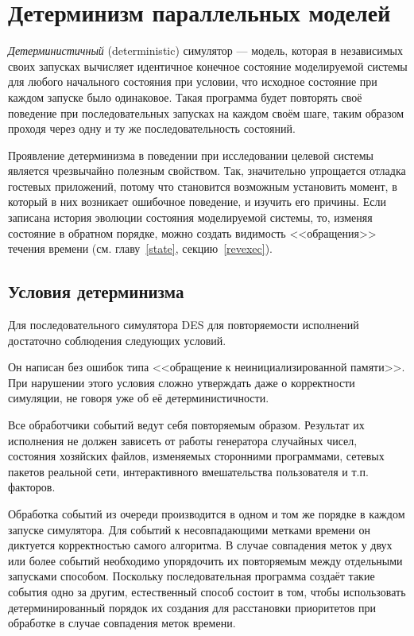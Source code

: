 \section{Детерминизм параллельных моделей}

\emph{Детерминистичный} (\abbr deterministic) симулятор — модель, которая в независимых своих запусках вычисляет идентичное конечное состояние моделируемой системы для любого начального состояния при условии, что исходное состояние при каждом запуске было одинаковое. Такая программа будет повторять своё поведение при последовательных запусках на каждом своём шаге, таким образом проходя через одну и ту же последовательность состояний. 

Проявление детерминизма в поведении при исследовании целевой системы является чрезвычайно полезным свойством. Так, значительно упрощается отладка гостевых приложений, потому что становится возможным установить момент, в который в них возникает ошибочное поведение, и изучить его причины. Если записана история эволюции состояния моделируемой системы, то, изменяя состояние в обратном порядке, можно создать видимость <<обращения>> течения времени (см. главу~\ref{state}, секцию~\ref{revexec}).

\subsection{Условия детерминизма}

Для последовательного симулятора DES для повторяемости исполнений достаточно соблюдения следующих условий.
\begin{enumerate*}
\item Он написан без ошибок типа <<обращение к неинициализированной памяти>>. При нарушении этого условия сложно утверждать даже о корректности симуляции, не говоря уже об её детерминистичности.
\item Все обработчики событий ведут себя повторяемым образом. Результат их исполнения не должен зависеть от работы генератора случайных чисел, состояния хозяйских файлов, изменяемых сторонними программами, сетевых пакетов реальной сети, интерактивного вмешательства пользователя и т.п. факторов.
\item Обработка событий из очереди производится в одном и том же порядке в каждом запуске симулятора.  Для событий к несовпадающими метками времени он диктуется корректностью самого алгоритма. В случае совпадения меток у двух или более событий необходимо упорядочить их повторяемым между отдельными запусками способом. Поскольку последовательная программа создаёт такие события одно за другим, естественный способ состоит в том, чтобы использовать детерминированный порядок их создания для расстановки приоритетов при обработке в случае совпадения меток времени.
\end{enumerate*}

